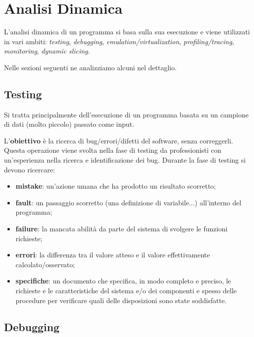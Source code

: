 \documentclass[a4paper, 11pt]{report}
\begin{document}
	\chapter*{Analisi Dinamica}
	L'analisi dinamica di un programma si basa sulla sua esecuzione e viene utilizzati in vari ambiti: \textit{testing}, \textit{debugging}, \textit{emulation/virtualization}, \textit{profiling/tracing}, \textit{monitoring}, \textit{dynamic slicing}.
	
	Nelle sezioni seguenti ne analizziamo alcuni nel dettaglio.
	
	\section*{Testing}
	Si tratta principalmente dell'esecuzione di un programma basata su un campione di dati (molto piccolo) passato come input.
	
	L'\textbf{obiettivo} è la ricerca di bug/errori/difetti del software, senza correggerli. Questa operazione viene svolta nella fase di testing da professionisti con un'esperienza nella ricerca e identificazione dei bug.
	\newline
	\newline
	\noindent
	Durante la fase di testing si devono ricercare:
	\begin{itemize}
		\item \textbf{mistake}: un'azione umana che ha prodotto un risultato scorretto;
		\item \textbf{fault}: un passaggio scorretto (una definizione di variabile...) all'interno del programma;
		\item \textbf{failure}: la mancata abilità da parte del sistema di svolgere le funzioni richieste;
		\item \textbf{errori}: la differenza tra il valore atteso e il valore effettivamente calcolato/osservato;
		\item \textbf{specifiche}: un documento che specifica, in modo completo e preciso, le richieste e le caratteristiche del sistema e/o dei componenti e spesso delle procedure per verificare quali delle disposizioni sono state soddisfatte.
	\end{itemize}

	\section*{Debugging}
	
\end{document}
